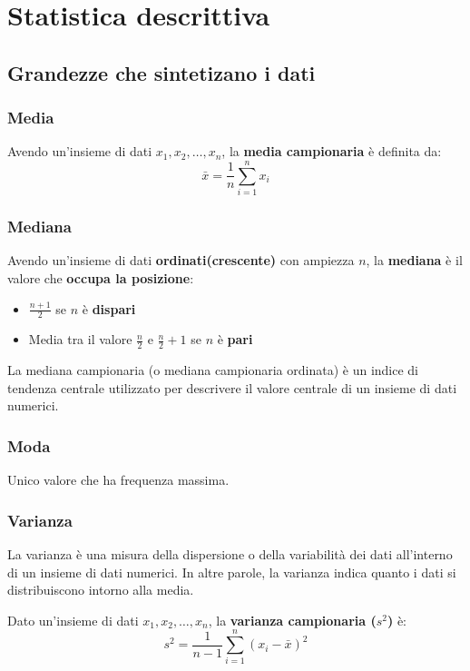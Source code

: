 \chapter{Statistica descrittiva}
\section{Grandezze che sintetizano i dati}

\subsection{Media}
Avendo un'insieme di dati $x_1, x_2, \dots, x_n$, la \textbf{media campionaria} è definita da:
\begin{equation}
  \bar{x} = \frac{1}{n} \sum_{i = 1}^n x_i
\end{equation}

\subsection{Mediana}
Avendo un'insieme di dati \textbf{ordinati(crescente)} con ampiezza $n$, la \textbf{mediana}
è il valore che \textbf{occupa la posizione}:
\begin{itemize}
  \item $\frac{n+1}{2}$ se $n$ è \textbf{dispari}
  \item Media tra il valore $\frac{n}{2}$ e $\frac{n}{2}+1$ se $n$ è \textbf{pari}
\end{itemize}

La mediana campionaria (o mediana campionaria ordinata) è un indice di tendenza centrale utilizzato per descrivere il valore centrale di un insieme di dati numerici.

\subsection{Moda}
Unico valore che ha frequenza massima.

\subsection{Varianza}
La varianza è una misura della dispersione o della variabilità dei dati all'interno di un insieme di dati numerici. In altre parole, la varianza indica quanto i dati si distribuiscono intorno alla media.

Dato un'insieme di dati $x_1, x_2, \dots, x_n$, la \textbf{varianza campionaria ($s^2$)} è:
\begin{equation}
  s^2 = \frac{1}{n-1} \sum_{i=1}^n (x_i - \bar{x})^2
\end{equation}

